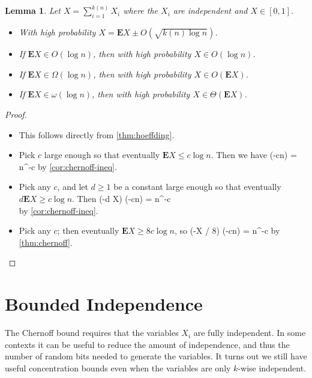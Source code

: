 \documentclass[11pt,a4paper]{article}
\newtheorem{lemma}[theorem]{Lemma}
\newcommand*{\E}[0]{\mathbf{E}}
\def\[#1\]{\begin{align*}#1\end{align*}}
\begin{document}
\begin{tcolorbox}
  \begin{lemma}
    Let \(X = \sum_{i=1}^{k(n)} X_i\) where the \(X_i\) are independent and \(X \in [0, 1]\).
    \begin{itemize}
    \item With high probability $X = \E X \pm O(\sqrt{k(n) \log n})$.
    \item If \(\E X \in O(\log n)\), then with high probability \(X \in O(\log n)\).
    \item If \(\E X \in \Omega(\log n)\), then with high probability \(X \in O(\E X)\).
    \item If \(\E X \in \omega(\log n)\), then with high probability \(X \in \Theta(\E X)\).
    \end{itemize}
  \end{lemma}
\end{tcolorbox}
\begin{proof}\hfill
  \begin{itemize}
  \item
    This follows directly from \cref{thm:hoeffding}.
  \item
    Pick $c$ large enough so that eventually \(\E X \le c \log n\).
    Then we have
    \[\Pr[X \ge 3c \log n] \le \exp(-c\log n) = n^{-c}\]
    by \cref{cor:chernoff-ineq}.
  \item
    Pick any \(c\),
    and let \(d \ge 1\) be a constant large enough so that eventually \(d \E X \ge c \log n\).
    Then \[
    \Pr[X \ge 3d \E X] \le \exp(-d \E X) \le \exp(-c\log n) = n^{-c} \\
    \]
    by \cref{cor:chernoff-ineq}.
  \item
    Pick any $c$; then eventually $\E X \ge 8c \log n$,
    so
    \[
    \Pr[X \le \E X / 2] \le \exp(-\E X / 8) \le \exp(-c\log n) = n^{-c}
    \]
    by \cref{thm:chernoff}.
  \end{itemize}
\end{proof}


\section{Bounded Independence}

The Chernoff bound requires that the variables \(X_i\) are fully independent.
In some contexts it can be useful to reduce the amount of independence, and thus the number of random bits needed to generate the variables.
It turns out we still have useful concentration bounds even when the variables are only \(k\)-wise independent.
\end{document}

